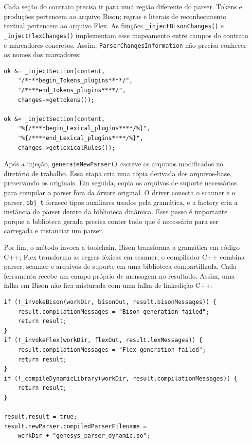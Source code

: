 \documentclass[12pt,a4paper]{article}
\begin{document}
Cada se\c{c}\~ao do contrato precisa ir para uma regi\~ao diferente do parser. Tokens e produ\c{c}\~oes pertencem ao arquivo Bison; regras e literais de reconhecimento textual pertencem ao arquivo Flex. As fun\c{c}\~oes \texttt{\_injectBisonChanges()} e \texttt{\_injectFlexChanges()} implementam esse mapeamento entre campos do contrato e marcadores concretos. Assim, \texttt{ParserChangesInformation} n\~ao precisa conhecer os nomes dos marcadores:

\begin{lstlisting}[style=cppsmall]
ok &= _injectSection(content,
    "/****begin_Tokens_plugins****/",
    "/****end_Tokens_plugins****/",
    changes->gettokens());

ok &= _injectSection(content,
    "%{/****begin_Lexical_plugins****/%}",
    "%{/****end_Lexical_plugins****/%}",
    changes->getlexicalRules());
\end{lstlisting}

Ap\'os a inje\c{c}\~ao, \texttt{generateNewParser()} escreve os arquivos modificados no diret\'orio de trabalho. Essa etapa cria uma c\'opia derivada dos arquivos-base, preservando os originais. Em seguida, copia os arquivos de suporte necess\'arios para compilar o parser fora da \'arvore original. O driver conecta o scanner e o parser, \texttt{obj\_t} fornece tipos auxiliares usados pela gram\'atica, e a factory cria a inst\^ancia do parser dentro da biblioteca din\^amica. Esse passo \'e importante porque a biblioteca gerada precisa conter tudo que \'e necess\'ario para ser carregada e instanciar um parser.

Por fim, o m\'etodo invoca a toolchain. Bison transforma a gram\'atica em c\'odigo C++; Flex transforma as regras l\'exicas em scanner; o compilador C++ combina parser, scanner e arquivos de suporte em uma biblioteca compartilhada. Cada ferramenta recebe um campo pr\'oprio de mensagem no resultado. Assim, uma falha em Bison n\~ao fica misturada com uma falha de linkedi\c{c}\~ao C++:

\begin{lstlisting}[style=cppsmall]
if (!_invokeBison(workDir, bisonOut, result.bisonMessages)) {
    result.compilationMessages = "Bison generation failed";
    return result;
}
if (!_invokeFlex(workDir, flexOut, result.lexMessages)) {
    result.compilationMessages = "Flex generation failed";
    return result;
}
if (!_compileDynamicLibrary(workDir, result.compilationMessages)) {
    return result;
}

result.result = true;
result.newParser.compiledParserFilename =
    workDir + "genesys_parser_dynamic.so";
\end{lstlisting}
\end{document}
